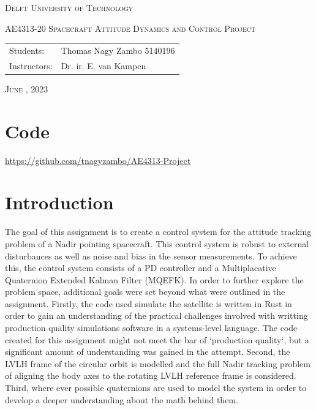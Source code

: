 \documentclass{article}
\begin{document}
\begin{titlepage}
	\centering
	\vspace{5cm}
	{\scshape\Huge Delft University of Technology \par}
	\vspace{1.5cm}
	{\scshape\Large AE4313-20 Spacecraft Attitude Dynamics and Control Project\par}
    
	\vspace{\fill}
	\flushleft
	{\scshape\large\begin{tabular}{@{}ll}
	    Students:       & Thomas Nagy Zambo 5140196 \\
	    Instructors:    & Dr. ir. E. van Kampen \\
	\end{tabular}\par}
	\vspace{0.5cm}
    
                        
    {\scshape\large June , 2023\par}
\end{titlepage}




\tableofcontents
\listoffigures
\section*{Code}
\url{https://github.com/tnagyzambo/AE4313-Project}

\newpage
{}
\setcounter{page}{1}

\section{Introduction}

The goal of this assignment is to create a control system for the attitude tracking problem of a Nadir pointing spacecraft. This control system is robust to external disturbances as well as noise and bias in the sensor measurements. To achieve this, the control system consists of a PD controller and a Multiplacative Quaternion Extended Kalman Filter (MQEFK). In order to further explore the problem space, additional goals were set beyond what were outlined in the assignment. Firstly, the code used simulate the satellite is written in Rust in order to gain an understanding of the practical challenges involved with writting production quality simulations software in a systems-level language. The code created for this assignment might not meet the bar of `production quality`, but a significant amount of understanding was gained in the attempt. Second, the LVLH frame of the circular orbit is modelled and the full Nadir tracking problem of aligning the body axes to the rotating LVLH reference frame is considered. Third, where ever possible quaternions are used to model the system in order to develop a deeper understanding about the math behind them.
\end{document}

